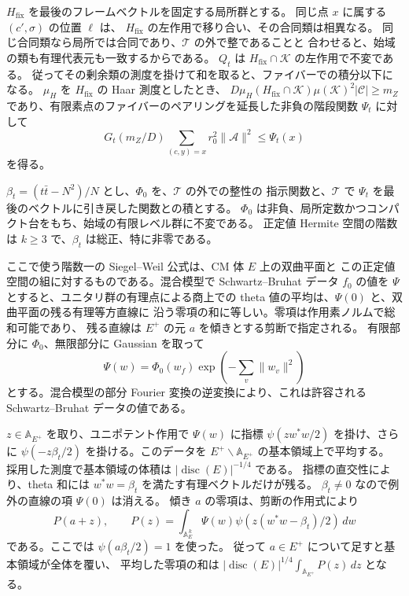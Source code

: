 \(H_{\mathrm{fix}}\) を最後のフレームベクトルを固定する局所群とする。
同じ点 \(x\) に属する \((c',\sigma)\) の位置 \(\ell\) は、
\(H_{\mathrm{fix}}\) の左作用で移り合い、その合同類は相異なる。
同じ合同類なら局所では合同であり、\(\mathcal T\) の外で整であることと
合わせると、始域の類も有理代表元も一致するからである。
\(Q_t\) は \(H_{\mathrm{fix}}\cap\mathcal K\) の左作用で不変である。
従ってその剰余類の測度を掛けて和を取ると、ファイバーでの積分以下になる。
\(\mu_H\) を \(H_{\mathrm{fix}}\) の Haar 測度としたとき、
\(D\mu_H(H_{\mathrm{fix}}\cap\mathcal K)\mu(\mathcal K)^2|\mathcal C|\ge m_Z\)
であり、有限素点のファイバーのペアリングを延長した非負の階段関数
\(\Psi_t\) に対して
\[
 G_t(m_Z/D)\sum_{(c,y)=x} r_0^2\|\mathcal A\|^2\le\Psi_t(x)
\]
を得る。

\(\beta_t=(t\bar t-N^2)/N\) とし、\(\Phi_0\) を、\(\mathcal T\) の外での整性の
指示関数と、\(\mathcal T\) で \(\Psi_t\) を最後のベクトルに引き戻した関数との積とする。
\(\Phi_0\) は非負、局所定数かつコンパクト台をもち、始域の有限レベル群に不変である。
正定値 Hermite 空間の階数は \(k\ge3\) で、\(\beta_t\) は総正、特に非零である。

ここで使う階数一の Siegel--Weil 公式は、CM 体 \(E\) 上の双曲平面と
この正定値空間の組に対するものである。混合模型で Schwartz--Bruhat データ
\(f_0\) の値を \(\Psi\) とすると、ユニタリ群の有理点による商上での
theta 値の平均は、\(\Psi(0)\) と、双曲平面の残る有理等方直線に
沿う零項の和に等しい。零項は作用素ノルムで総和可能であり、
残る直線は \(E^+\) の元 \(a\) を傾きとする剪断で指定される。
有限部分に \(\Phi_0\)、無限部分に Gaussian を取って
\[
 \Psi(w)=\Phi_0(w_f)\exp\!\left(-\sum_v\|w_v\|^2\right)
\]
とする。混合模型の部分 Fourier 変換の逆変換により、これは許容される
Schwartz--Bruhat データの値である。

\(z\in\mathbb A_{E^+}\) を取り、ユニポテント作用で
\(\Psi(w)\) に指標 \(\psi(zw^*w/2)\) を掛け、さらに
\(\psi(-z\beta_t/2)\) を掛ける。このデータを
\(E^+\backslash\mathbb A_{E^+}\) の基本領域上で平均する。
採用した測度で基本領域の体積は \(|\operatorname{disc}(E)|^{-1/4}\) である。
指標の直交性により、theta 和には \(w^*w=\beta_t\) を満たす有理ベクトルだけが残る。
\(\beta_t\ne0\) なので例外の直線の項 \(\Psi(0)\) は消える。
傾き \(a\) の零項は、剪断の作用式により
\[
 P(a+z),\qquad
 P(z)=\int_{\mathbb A_E^{\,k}}\Psi(w)
             \psi\!\left(z(w^*w-\beta_t)/2\right)\,dw
\]
である。ここでは \(\psi(a\beta_t/2)=1\) を使った。
従って \(a\in E^+\) について足すと基本領域が全体を覆い、
平均した零項の和は
\(\left|\operatorname{disc}(E)\right|^{1/4}\int_{\mathbb A_{E^+}}P(z)\,dz\)
となる。

